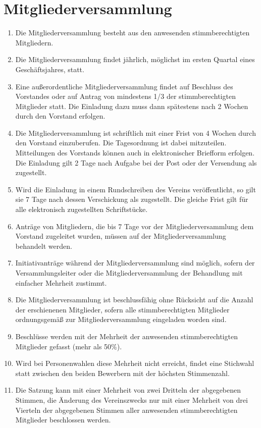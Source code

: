 \documentclass[10pt, twocolumn, parskip=half]{scrartcl}
\begin{document}
\section{Mitgliederversammlung}
\begin{enumerate}[noitemsep]
	\item Die Mitgliederversammlung besteht aus den anwesenden stimmberechtigten Mitgliedern.
	\item Die Mitgliederversammlung findet jährlich, möglichst im ersten Quartal eines Geschäftsjahres, statt.
	\item Eine außerordentliche Mitgliederversammlung findet auf Beschluss des Vorstandes oder auf Antrag von mindestens 1/3 der stimmberechtigten Mitglieder statt. Die Einladung dazu muss dann spätestens nach 2 Wochen durch den Vorstand erfolgen.
	\item Die Mitgliederversammlung ist schriftlich mit einer Frist von 4 Wochen durch den Vorstand einzuberufen. Die Tagesordnung ist dabei mitzuteilen. Mitteilungen des Vorstands können auch in elektronischer Briefform erfolgen.
	Die Einladung gilt 2 Tage nach Aufgabe bei der Post oder der Versendung als zugestellt.
	\item Wird die Einladung in einem Rundschreiben des Vereins veröffentlicht, so gilt sie 7 Tage nach dessen Verschickung als zugestellt. Die gleiche Frist gilt für alle elektronisch zugestellten Schriftstücke.
	\item Anträge von Mitgliedern, die bis 7 Tage vor der Mitgliederversammlung dem
	Vorstand zugeleitet wurden, müssen auf der Mitgliederversammlung behandelt werden.
	\item Initiativanträge während der Mitgliederversammlung sind möglich, sofern der Versammlungsleiter oder die Mitgliederversammlung der Behandlung mit einfacher Mehrheit zustimmt.
	\item Die Mitgliederversammlung ist beschlussfähig ohne Rücksicht auf die Anzahl der erschienenen Mitglieder, sofern alle stimmberechtigten Mitglieder ordnungsgemäß zur Mitgliederversammlung eingeladen worden sind.
	\item Beschlüsse werden mit der Mehrheit der anwesenden stimmberechtigten Mitglieder gefasst (mehr als 50\%).
	\item Wird bei Personenwahlen diese Mehrheit nicht erreicht, findet eine Stichwahl statt zwischen den beiden Bewerbern mit der höchsten Stimmenzahl.
	\item Die Satzung kann mit einer Mehrheit von zwei Dritteln der abgegebenen Stimmen, die Änderung des Vereinszwecks nur mit einer Mehrheit von drei Vierteln der abgegebenen Stimmen aller anwesenden stimmberechtigten Mitglieder beschlossen werden.
\end{enumerate}
\end{document}

